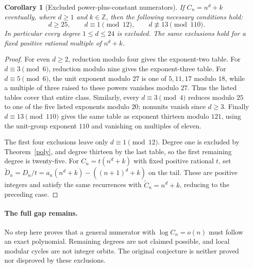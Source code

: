\documentclass[11pt]{article}
\newtheorem{corollary}{Corollary}
\begin{document}
\begin{corollary}[Excluded power-plus-constant numerators]
If $C_n=n^d+k$ eventually, where $d\ge1$ and $k\in\mathbb Z$, then the
following necessary conditions hold:
\[
 d\ge25,\qquad d\equiv1\pmod{12},\qquad d\not\equiv13\pmod{110}.
\]
In particular every degree $1\le d\le24$ is excluded.
The same exclusions hold for a fixed positive rational multiple of
$n^d+k$.
\end{corollary}
\begin{proof}
For even $d\ge2$, reduction modulo four gives the exponent-two table.
For $d\equiv3\pmod6$, reduction modulo nine gives the exponent-three
table. For $d\equiv5\pmod6$, the unit exponent modulo $27$ is one of
$5,11,17$ modulo $18$, while a multiple of three raised to these powers
vanishes modulo $27$. Thus the listed tables cover that entire class.
Similarly, every $d\equiv3\pmod4$ reduces modulo $25$ to one of the five
listed exponents modulo $20$; nonunits vanish since $d\ge3$.
Finally $d\equiv13\pmod{110}$ gives the same table as exponent thirteen
modulo $121$, using the unit-group exponent $110$ and vanishing on
multiples of eleven.

The first four exclusions leave only $d\equiv1\pmod{12}$.
Degree one is excluded by Theorem~\ref{poly}, and degree thirteen by the
last table, so the first remaining degree is twenty-five.
For $C_n=t(n^d+k)$ with fixed positive rational $t$, set
$\widetilde D_n=D_n/t=a_n(n^d+k)-((n+1)^d+k)$ on the tail.
These are positive integers and satisfy the same recurrences with
$\widetilde C_n=n^d+k$, reducing to the preceding case.
\end{proof}

\paragraph{The full gap remains.}
No step here proves that a general numerator with $\log C_n=o(n)$ must
follow an exact polynomial. Remaining degrees are not claimed possible,
and local modular cycles are not integer orbits. The original conjecture
is neither proved nor disproved by these exclusions.
\end{document}
